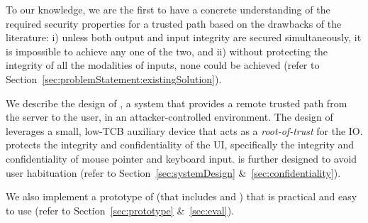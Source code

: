 \begin{mybullet}
  \item To our knowledge, we are the first to have a concrete understanding of the required security properties for a trusted path based on the drawbacks of the literature: i) unless both output and input integrity are secured simultaneously, it is impossible to achieve any one of the two, and ii) without protecting the integrity of all the modalities of inputs, none could be achieved (refer to Section~\ref{sec:problemStatement:existingSolution}).
  \item We describe the design of \name, a system that provides a remote trusted path from the server to the user, in an attacker-controlled environment. The design of \name leverages a small, low-TCB auxiliary device that acts as a \emph{root-of-trust} for the IO. \name protects the integrity and confidentiality of the UI, specifically the integrity and confidentiality of mouse pointer and keyboard input. \name is further designed to avoid user habituation (refer to Section~\ref{sec:systemDesign} \&~\ref{sec:confidentiality}). %
  \item We also implement a prototype of \name (that includes \device and \name \js) that is practical and easy to use (refer to Section~\ref{sec:prototype} \&~\ref{sec:eval}).
\end{mybullet}



 